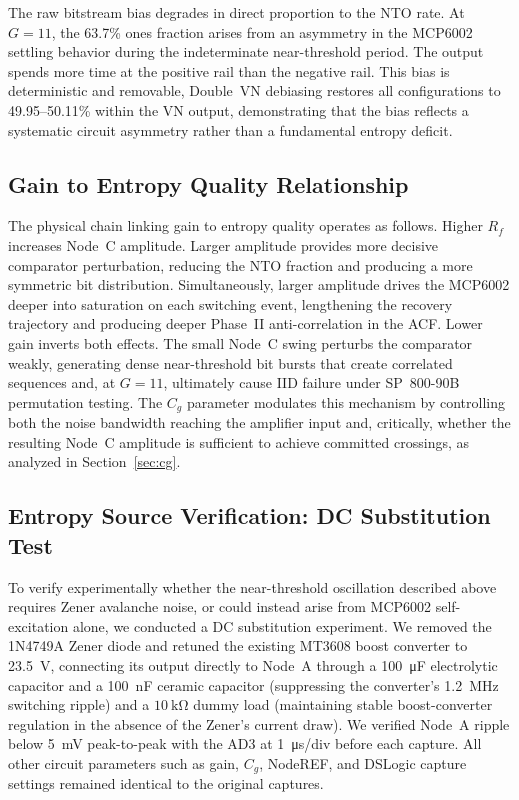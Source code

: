\documentclass[conference]{IEEEtran}
\newcommand{\Cg}{\ensuremath{C_g}}
\newcommand{\Rf}{\ensuremath{R_f}}
\begin{document}
The raw bitstream bias degrades in direct proportion to the NTO rate.
At $G=11$, the 63.7\% ones fraction arises from an asymmetry in the
MCP6002 settling behavior during the indeterminate near-threshold
period. The output spends more time at the positive rail than the
negative rail. This bias is deterministic and removable,
Double~VN debiasing restores all configurations to 49.95--50.11\%
within the VN output, demonstrating that the bias reflects a
systematic circuit asymmetry rather than a fundamental entropy
deficit.

\subsection{Gain to Entropy Quality Relationship}

The physical chain linking gain to entropy quality operates as
follows. Higher $\Rf$ increases Node~C amplitude. Larger amplitude
provides more decisive comparator perturbation, reducing the NTO
fraction and producing a more symmetric bit distribution.
Simultaneously, larger amplitude drives the MCP6002 deeper into
saturation on each switching event, lengthening the recovery
trajectory and producing deeper Phase~II anti-correlation in the ACF.
Lower gain inverts both effects. The small Node~C swing perturbs the
comparator weakly, generating dense near-threshold bit bursts that
create correlated sequences and, at $G=11$, ultimately cause IID
failure under SP~800-90B permutation testing. The $\Cg$ parameter
modulates this mechanism by controlling both the noise bandwidth
reaching the amplifier input and, critically, whether the resulting Node~C amplitude is sufficient to achieve committed crossings, as analyzed in Section~\ref{sec:cg}.

\subsection{Entropy Source Verification: DC Substitution Test}
\label{sec:dcsub}

To verify experimentally whether the near-threshold oscillation
described above requires Zener avalanche noise, or could instead arise
from MCP6002 self-excitation alone, we conducted a DC substitution
experiment. We removed the 1N4749A Zener diode and retuned the
existing MT3608 boost converter to \SI{23.5}{\volt}, connecting its
output directly to Node~A through a \SI{100}{\micro\farad}
electrolytic capacitor and a \SI{100}{\nano\farad} ceramic capacitor
(suppressing the converter's \SI{1.2}{\mega\hertz} switching ripple)
and a $\SI{10}{\kilo\ohm}$ dummy load (maintaining stable
boost-converter regulation in the absence of the Zener's current
draw). We verified Node~A ripple below \SI{5}{\milli\volt}
peak-to-peak with the AD3 at \SI{1}{\micro\second}/div before each
capture. All other circuit parameters such as gain, $\Cg$, NodeREF, and
DSLogic capture settings remained identical to the original
captures.
\end{document}
